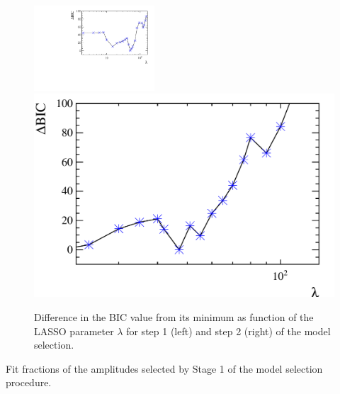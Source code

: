 \begin{figure}[b]
  \centering
  \includegraphics[width=0.4\textwidth, height=!]{figs/lassoFit/Lasso_BIC.pdf} 
  \includegraphics[width=0.4\linewidth, height=!]{figs/fullFit/ReLasso_BIC.pdf}
  \caption{Difference in the BIC value from its minimum as function of the LASSO parameter $\lambda$ for step 1 (left) and step 2 (right) of the model selection.}
  \label{fig:BIC}
\end{figure}

\begin{table}[h]
\centering
\caption{
\small Fit fractions of the amplitudes selected by Stage 1 of the model selection procedure.
}

\label{tab:lassoFit}
\end{table}

